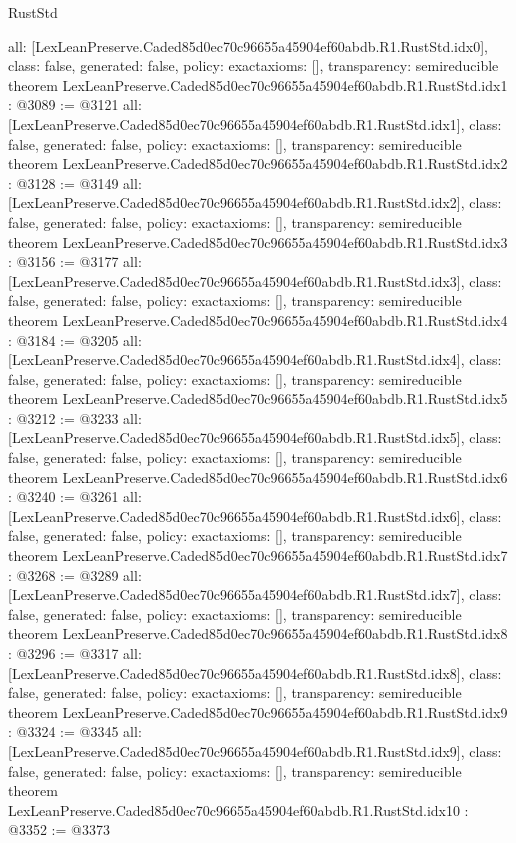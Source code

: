\begin{lexlean}{RustStd}
\begin{coremodule}
{  all: [LexLeanPreserve.Caded85d0ec70c96655a45904ef60abdb.R1.RustStd.idx0],
  class: false,
  generated: false,
  policy: exact{axioms: []},
  transparency: semireducible
}
theorem LexLeanPreserve.Caded85d0ec70c96655a45904ef60abdb.R1.RustStd.idx1 : @3089 := @3121 {
  all: [LexLeanPreserve.Caded85d0ec70c96655a45904ef60abdb.R1.RustStd.idx1],
  class: false,
  generated: false,
  policy: exact{axioms: []},
  transparency: semireducible
}
theorem LexLeanPreserve.Caded85d0ec70c96655a45904ef60abdb.R1.RustStd.idx2 : @3128 := @3149 {
  all: [LexLeanPreserve.Caded85d0ec70c96655a45904ef60abdb.R1.RustStd.idx2],
  class: false,
  generated: false,
  policy: exact{axioms: []},
  transparency: semireducible
}
theorem LexLeanPreserve.Caded85d0ec70c96655a45904ef60abdb.R1.RustStd.idx3 : @3156 := @3177 {
  all: [LexLeanPreserve.Caded85d0ec70c96655a45904ef60abdb.R1.RustStd.idx3],
  class: false,
  generated: false,
  policy: exact{axioms: []},
  transparency: semireducible
}
theorem LexLeanPreserve.Caded85d0ec70c96655a45904ef60abdb.R1.RustStd.idx4 : @3184 := @3205 {
  all: [LexLeanPreserve.Caded85d0ec70c96655a45904ef60abdb.R1.RustStd.idx4],
  class: false,
  generated: false,
  policy: exact{axioms: []},
  transparency: semireducible
}
theorem LexLeanPreserve.Caded85d0ec70c96655a45904ef60abdb.R1.RustStd.idx5 : @3212 := @3233 {
  all: [LexLeanPreserve.Caded85d0ec70c96655a45904ef60abdb.R1.RustStd.idx5],
  class: false,
  generated: false,
  policy: exact{axioms: []},
  transparency: semireducible
}
theorem LexLeanPreserve.Caded85d0ec70c96655a45904ef60abdb.R1.RustStd.idx6 : @3240 := @3261 {
  all: [LexLeanPreserve.Caded85d0ec70c96655a45904ef60abdb.R1.RustStd.idx6],
  class: false,
  generated: false,
  policy: exact{axioms: []},
  transparency: semireducible
}
theorem LexLeanPreserve.Caded85d0ec70c96655a45904ef60abdb.R1.RustStd.idx7 : @3268 := @3289 {
  all: [LexLeanPreserve.Caded85d0ec70c96655a45904ef60abdb.R1.RustStd.idx7],
  class: false,
  generated: false,
  policy: exact{axioms: []},
  transparency: semireducible
}
theorem LexLeanPreserve.Caded85d0ec70c96655a45904ef60abdb.R1.RustStd.idx8 : @3296 := @3317 {
  all: [LexLeanPreserve.Caded85d0ec70c96655a45904ef60abdb.R1.RustStd.idx8],
  class: false,
  generated: false,
  policy: exact{axioms: []},
  transparency: semireducible
}
theorem LexLeanPreserve.Caded85d0ec70c96655a45904ef60abdb.R1.RustStd.idx9 : @3324 := @3345 {
  all: [LexLeanPreserve.Caded85d0ec70c96655a45904ef60abdb.R1.RustStd.idx9],
  class: false,
  generated: false,
  policy: exact{axioms: []},
  transparency: semireducible
}
theorem LexLeanPreserve.Caded85d0ec70c96655a45904ef60abdb.R1.RustStd.idx10 : @3352 := @3373 {
}
\end{coremodule}
\end{lexlean}

